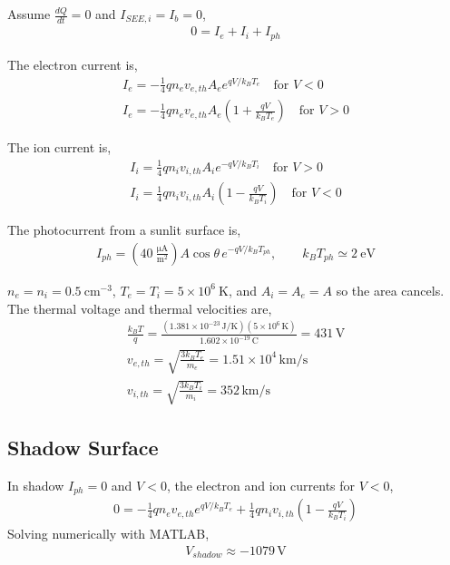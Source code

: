 \documentclass[11pt]{article}
\begin{document}
\hspace*{2em}Assume $\frac{dQ}{dt} = 0$ and $I_{SEE,i} = I_b = 0$,
\begin{gather*}
0 = I_e + I_i + I_{ph}
\end{gather*}

\hspace*{2em}The electron current is,
\begin{gather*}
I_e = -\frac{1}{4} q n_e v_{e,th} A_e e^{qV/k_B T_e} \quad \text{for } V < 0 \\
I_e = -\frac{1}{4} q n_e v_{e,th} A_e \left(1 + \frac{qV}{k_B T_e}\right) \quad \text{for } V > 0
\end{gather*}

\hspace*{2em}The ion current is,
\begin{gather*}
I_i = \frac{1}{4} q n_i v_{i,th} A_i e^{-qV/k_B T_i} \quad \text{for } V > 0 \\
I_i = \frac{1}{4} q n_i v_{i,th} A_i \left(1 - \frac{qV}{k_B T_i}\right) \quad \text{for } V < 0
\end{gather*}

\hspace*{2em}The photocurrent from a sunlit surface is,
\begin{gather*}
I_{ph} = \left(40~\mathrm{\frac{\mu A}{m^2}}\right) A\cos\theta\, e^{-qV/k_B T_{ph}}, \qquad k_B T_{ph} \simeq 2~\mathrm{eV}
\end{gather*}

\hspace*{2em}$n_e = n_i = 0.5~\mathrm{cm^{-3}}$, $T_e = T_i = 5\times10^{6}~\mathrm{K}$, and $A_i = A_e = A$ so the area cancels.
The thermal voltage and thermal velocities are,
\begin{gather*}
\frac{k_B T}{q} = \frac{(1.381\times10^{-23}\,\mathrm{J/K})(5\times10^{6}\,\mathrm{K})}{1.602\times10^{-19}\,\mathrm{C}} = 431\,\mathrm{V} \\
v_{e,th} = \sqrt{\frac{3 k_B T_e}{m_e}} = 1.51\times10^{4}\,\mathrm{km/s} \\
v_{i,th} = \sqrt{\frac{3 k_B T_i}{m_i}} = 352\,\mathrm{km/s}
\end{gather*}

\subsection*{Shadow Surface}
\hspace*{2em}In shadow $I_{ph} = 0$ and $V < 0$, the electron and ion currents for $V<0$,
\begin{gather*}
0 = -\frac{1}{4} q n_e v_{e,th} e^{qV/k_B T_e} + \frac{1}{4} q n_i v_{i,th}\left(1 - \frac{qV}{k_B T_i}\right)
\end{gather*}
\hspace*{2em}Solving numerically with MATLAB,
\begin{gather*}
\boxed{V_{shadow} \approx -1079\,\mathrm{V}}
\end{gather*}
\end{document}
